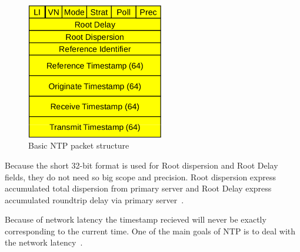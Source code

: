 
\begin{figure}
	\centering
	\includegraphics[width=6cm,keepaspectratio]{fig/ntp-packet.png}
	\caption{Basic NTP packet structure}
	\label{fig:ntp-packet}
	\bigskip
\end{figure}


Because the short 32-bit format is used for Root dispersion and Root Delay fields,
they do not need so big scope and precision.
Root dispersion express accumulated total dispersion from primary server
and Root Delay express accumulated roundtrip delay via primary server~\cite{ntp-arch}.


Because of network latency the timestamp recieved will never be exactly corresponding to
the current time.
One of the main goals of NTP is to deal with the network latency~\cite{ntp-overview}.

